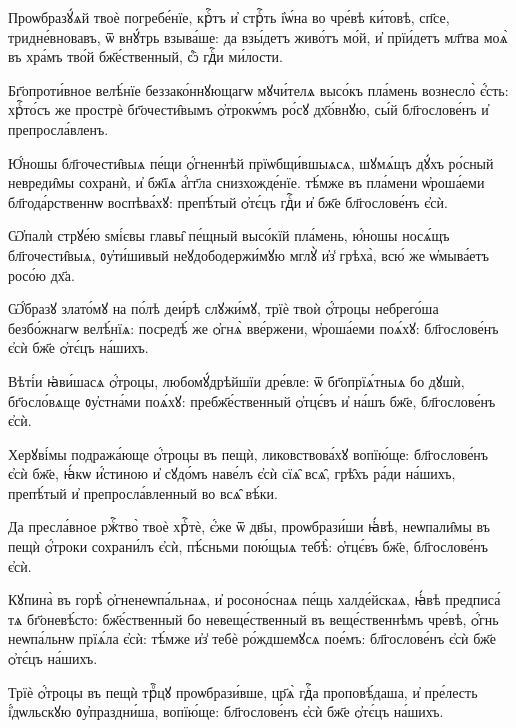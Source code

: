 \hKv Проѡбразꙋ́ѧй твоѐ погребе́нїе, крⷭ҇тъ и҆ стрⷭ҇ть і҆ѡ́на во  чре́вѣ ки́товѣ, сп҃се, тридне́вновавъ, ѿ внꙋ́трь  взыва́ше: да взы́детъ живо́тъ мо́й, и҆ прїи́детъ мл҃тва моѧ̀  въ хра́мъ тво́й бж҃е́ственный, ѽ гдⷭ҇и ми́лости. 
%

\hKv Бг҃опроти́вное велѣ́нїе беззако́ннꙋющагѡ мꙋчи́телѧ высо́къ  пла́мень вознесло̀ є҆́сть: хрⷭ҇то́съ же прострѐ  бг҃очести̑вымъ ѻ҆трокѡ́мъ ро́сꙋ дх҃о́внꙋю, сы́й  бл҃гослове́нъ и҆ препросла́вленъ. 
%

\hKv Ю҆́ношы бл҃гочести̑выѧ пе́щи ѻ҆́гненнѣй  прїѡбщи́вшыѧсѧ, шꙋмѧ́щъ дꙋ́хъ ро́сный невреди̑мы сохранѝ,  и҆ бж҃їѧ а҆́гг҃ла  снизхожде́нїе.  тѣ́мже въ пла́мени ѡ҆роша́еми бл҃года́рственнѡ воспѣва́хꙋ:  препѣ́тый ѻ҆тє́цъ гдⷭ҇и и҆ бж҃е бл҃гослове́нъ є҆сѝ. 

\hKv Ѡ҆палѝ стрꙋе́ю ѕмі́євы главы̑ пе́щный высо́кїй пла́мень,  ю҆́ношы носѧ́щъ бл҃гочести̑выѧ, ᲂу҆ти́шивый  неꙋдободержи́мꙋю мглꙋ̀ и҆з̾ грѣха̀, всю́ же ѡ҆мыва́етъ  росо́ю дх҃а. 
%

\hKv Ѡ҆́бразꙋ злато́мꙋ на по́лѣ деи́рѣ слꙋжи́мꙋ, трїѐ твоѝ  ѻ҆́троцы небрего́ша безбо́жнагѡ велѣ́нїѧ: посредѣ́ же  ѻ҆гнѧ̀ вве́ржени, ѡ҆роша́еми поѧ́хꙋ: бл҃гослове́нъ є҆сѝ  бж҃е ѻ҆тє́цъ на́шихъ. 

\hKv Вѣті́и ꙗ҆ви́шасѧ ѻ҆́троцы, любомꙋ́дрѣйшїи дре́вле: ѿ  бг҃опрїѧ́тныѧ бо дꙋшѝ, бг҃осло́вѧще ᲂу҆стна́ми поѧ́хꙋ:  пребж҃е́ственный ѻ҆тцє́въ и҆ на́шъ бж҃е, бл҃гослове́нъ  є҆сѝ. 
%

\hKv Херꙋві́мы подража́юще ѻ҆́троцы въ пещѝ, ликовствова́хꙋ  вопїю́ще: бл҃гослове́нъ є҆сѝ бж҃е, ꙗ҆́кѡ и҆́стиною и҆  сꙋдо́мъ наве́лъ є҆сѝ сїѧ̑ всѧ̑,  грѣ̑хъ ра́ди на́шихъ, препѣ́тый и҆ препросла́вленный  во всѧ̑ вѣ́ки. 

\hKv Да пресла́вное ржⷭ҇тво̀ твоѐ хрⷭ҇тѐ, є҆́же ѿ дв҃ы,  проѡбрази́ши ꙗ҆́вѣ, неѡпали̑мы въ пещѝ ѻ҆́троки  сохрани́лъ є҆сѝ, пѣ́сньми пою́щыѧ тебѣ̀: ѻ҆тцє́въ  бж҃е, бл҃гослове́нъ є҆сѝ. 
%

\hKv Кꙋпина̀ въ горѣ̀ ѻ҆гненеѡпа́льнаѧ, и҆  росоно́снаѧ пе́щь халде́йскаѧ, ꙗ҆́вѣ предписа́ тѧ  бг҃оневѣ́сто: бж҃е́ственный бо невеще́ственный въ  веще́ственнѣмъ чре́вѣ, ѻ҆́гнь неѡпа́льнѡ прїѧ́ла є҆сѝ:  тѣ́мже и҆з̾ тебѐ ро́ждшемꙋсѧ пое́мъ: бл҃гослове́нъ є҆сѝ  бж҃е ѻ҆тє́цъ на́шихъ. 

\hKv Трїѐ ѻ҆́троцы въ пещѝ трⷪ҇цꙋ проѡбрази́вше, цр҃ѧ̀ гдⷭ҇а  проповѣ́даша, и҆ пре́лесть і҆́дѡльскꙋю ᲂу҆праздни́ша,  вопїю́ще: бл҃гослове́нъ є҆сѝ бж҃е ѻ҆тє́цъ на́шихъ. 

